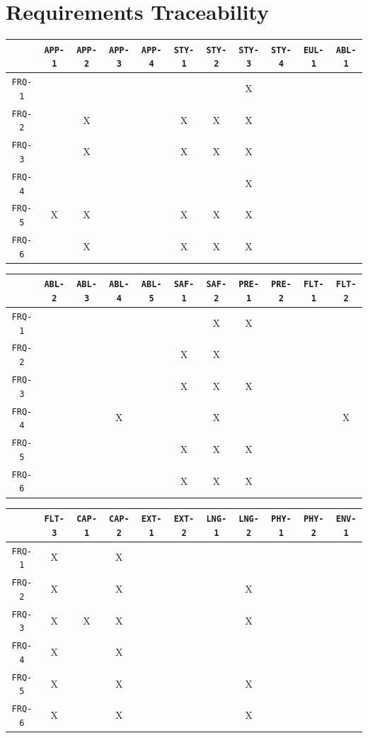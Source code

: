 \documentclass[12pt]{article}
\begin{document}
\section{Requirements Traceability}


\centering
\begin{tabular}{|c|c|c|c|c|c|c|c|c|c|c|}
\hline
	& \texttt{APP-1} & \texttt{APP-2} & \texttt{APP-3} & \texttt{APP-4} & \texttt{STY-1} & \texttt{STY-2} & \texttt{STY-3} & \texttt{STY-4} & \texttt{EUL-1} & \texttt{ABL-1} \\
\hline
\texttt{FRQ-1} &  &  &  &  &  &  & X &  &  &  \\ \hline
\texttt{FRQ-2} &  & X &  &  & X & X & X &  &  &  \\ \hline
\texttt{FRQ-3} &  & X &  &  & X & X & X &  &  &  \\ \hline
\texttt{FRQ-4} &  &  &  &  &  &  & X &  &  &  \\ \hline
\texttt{FRQ-5} & X & X &  &  & X & X & X &  &  &  \\ \hline
\texttt{FRQ-6} &  & X &  &  & X & X & X &  &  &  \\ \hline
\end{tabular}

\begin{tabular}{|c|c|c|c|c|c|c|c|c|c|c|}
\hline
	& \texttt{ABL-2} & \texttt{ABL-3} & \texttt{ABL-4} & \texttt{ABL-5} & \texttt{SAF-1} & \texttt{SAF-2} & \texttt{PRE-1} & \texttt{PRE-2} & \texttt{FLT-1} & \texttt{FLT-2} \\
\hline
\texttt{FRQ-1} &  &  &  &  &  & X & X &  &  &  \\ \hline
\texttt{FRQ-2} &  &  &  &  & X & X &  &  &  &  \\ \hline
\texttt{FRQ-3} &  &  &  &  & X & X & X &  &  &  \\ \hline
\texttt{FRQ-4} &  &  & X &  &  & X &  &  &  & X \\ \hline
\texttt{FRQ-5} &  &  &  &  & X & X & X &  &  &  \\ \hline
\texttt{FRQ-6} &  &  &  &  & X & X & X &  &  &  \\ \hline
\end{tabular}

\begin{tabular}{|c|c|c|c|c|c|c|c|c|c|c|}
\hline
	& \texttt{FLT-3} & \texttt{CAP-1} & \texttt{CAP-2} & \texttt{EXT-1} & \texttt{EXT-2} & \texttt{LNG-1} & \texttt{LNG-2} & \texttt{PHY-1} & \texttt{PHY-2} & \texttt{ENV-1} \\
\hline
\texttt{FRQ-1} & X &  & X &  &  &  &  &  &  &  \\ \hline
\texttt{FRQ-2} & X &  & X &  &  &  & X &  &  &  \\ \hline
\texttt{FRQ-3} & X & X & X &  &  &  & X &  &  &  \\ \hline
\texttt{FRQ-4} & X &  & X &  &  &  &  &  &  &  \\ \hline
\texttt{FRQ-5} & X &  & X &  &  &  & X &  &  &  \\ \hline
\texttt{FRQ-6} & X &  & X &  &  &  & X &  &  &  \\ \hline
\end{tabular}
\end{document}
